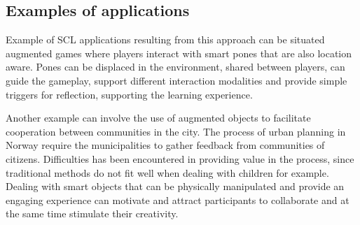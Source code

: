 \subsection{Examples of applications}
Example of SCL applications resulting from this approach can be situated augmented games where players interact with smart pones that are also location aware. Pones can be displaced in the environment, shared between players, can guide the gameplay, support different interaction modalities and provide simple triggers for reflection, supporting the learning experience.

Another example can involve the use of augmented objects to facilitate cooperation between communities in the city. The process of urban planning in Norway require the municipalities to gather feedback from communities of citizens.
Difficulties has been encountered in providing value in the process, since traditional methods do not fit well when dealing with children for example.
Dealing with smart objects that can be physically manipulated and provide an engaging experience can motivate and attract participants to collaborate and at the same time stimulate their creativity.